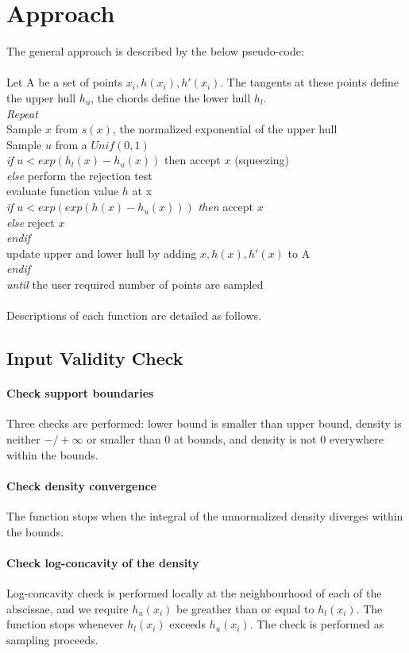 \documentclass{article}\usepackage[]{graphicx}\usepackage[]{color}
\begin{document}
\section{Approach}
The general approach is described by the below pseudo-code:\\
\\
Let A be a set of points $x_i, h(x_i), h'(x_i)$. The tangents at these points
define the upper hull $h_u$, the chords define the lower hull $h_l$.\\
\textit{Repeat}\\
Sample $x$ from $s(x)$, the normalized exponential of the upper hull\\
Sample $u$ from a $Unif(0,1)$\\
\indent \textit{if} $u < exp(h_l(x) - h_u(x))$ then accept $x$ (squeezing)\\
\indent \textit{else} perform the rejection test\\
\indent \indent evaluate function value $h$ at x\\
\indent \indent \textit{if} $u < exp(exp(h(x) - h_u(x)))$ \textit{then} accept $x$\\
\indent \indent \textit{else} reject $x$\\
\indent \indent \textit{endif}\\
\indent \indent update upper and lower hull by adding {$x, h(x), h'(x)$} to A\\
\indent \textit{endif}\\
\textit{until} the user required number of points are sampled\\
\\
Descriptions of each function are detailed as follows.
\subsection{Input Validity Check}
\paragraph{Check support boundaries}
Three checks are performed: lower bound is smaller than upper bound, 
density is neither $-/+ \infty$ or smaller than 0 at bounds, and density is not
0 everywhere within the bounds.
\paragraph{Check density convergence}
The function stops when the integral of the unnormalized density diverges within 
the bounds.
\paragraph{Check log-concavity of the density}
Log-concavity check is performed locally at the neighbourhood of each of the 
abscissae, and we require $h_u(x_i)$ be greather than or equal to $h_l(x_i)$. 
The function stops whenever $h_l(x_i)$ exceeds $h_u(x_i)$. The
check is performed as sampling proceeds.
\end{document}
